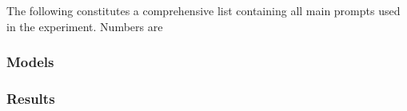 The following constitutes a comprehensive list containing all main prompts used in the experiment.
Numbers are 



\subsubsection{Models}

\subsubsection{Results}

